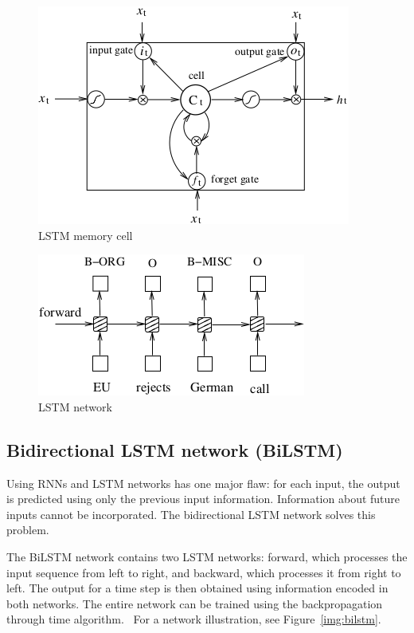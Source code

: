 \begin{figure}[htbp]
    \centering
    \includegraphics{text/images/lstm_cell.png}
    \caption{LSTM memory cell~\cite{BiLSTMCRF}}\label{img:lstm-cell}
\end{figure}

\begin{figure}[htbp]
    \centering
    \includegraphics{text/images/lstm.png}
    \caption{LSTM network~\cite{BiLSTMCRF}}\label{img:lstm}
\end{figure}

\subsection{Bidirectional LSTM network (BiLSTM)}
Using RNNs and LSTM networks has one major flaw: for each input, the output is predicted using only the previous input information. Information about future inputs cannot be incorporated. The bidirectional LSTM network solves this problem.

The BiLSTM network contains two LSTM networks: forward, which processes the input sequence from left to right, and backward, which processes it from right to left. The output for a time step is then obtained using information encoded in both networks. The entire network can be trained using the backpropagation through time algorithm.~\cite{BiLSTMCRF} For a network illustration, see Figure~\ref{img:bilstm}.

